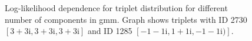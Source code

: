 \begin{figure}[tp]
    \begin{minipage}[h]{0.5\linewidth}
    \end{minipage}
    \begin{minipage}[h]{0.5\linewidth}
    \end{minipage}

    \caption{Log-likelihood dependence for triplet distribution for different number of components in \gls{gmm}. Graph shows triplets with ID 2730 $[3+3\mathrm{i}, 3+3\mathrm{i}, 3+3\mathrm{i}]$ and ID 1285 $[-1-1\mathrm{i}, 1+1\mathrm{i}, -1-1\mathrm{i})]$.}
    \label{fig:lines_different_mix}
\end{figure}